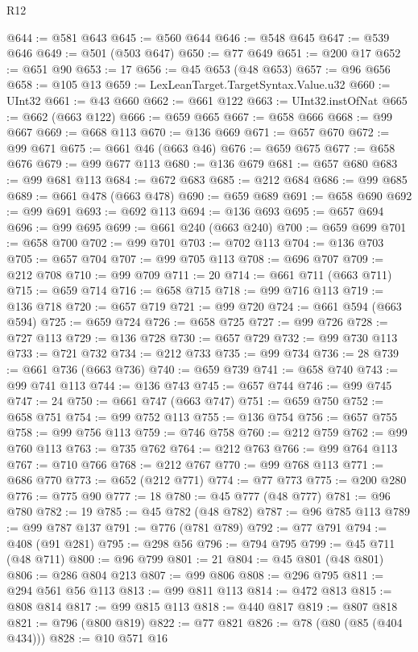 \begin{lexlean}{R12}
\begin{coremodule}
{{{{{{{{{{{{{{{{{{{{{{{{{{{{{{{{{{{{{{{{{{{{{{{{{{{{{{{{{{{{{{{{{{{{{{{{{{{{{{{{{{{{{{{{{{{{{{{{{{{{{{{{{{@644 := @581 @643
@645 := @560 @644
@646 := @548 @645
@647 := @539 @646
@649 := @501 (@503 @647)
@650 := @77 @649
@651 := @200 @17
@652 := @651 @90
@653 := 17
@656 := @45 @653 (@48 @653)
@657 := @96 @656
@658 := @105 @13
@659 := LexLeanTarget.TargetSyntax.Value.u32
@660 := UInt32
@661 := @43 @660
@662 := @661 @122
@663 := UInt32.instOfNat
@665 := @662 (@663 @122)
@666 := @659 @665
@667 := @658 @666
@668 := @99 @667
@669 := @668 @113
@670 := @136 @669
@671 := @657 @670
@672 := @99 @671
@675 := @661 @46 (@663 @46)
@676 := @659 @675
@677 := @658 @676
@679 := @99 @677 @113
@680 := @136 @679
@681 := @657 @680
@683 := @99 @681 @113
@684 := @672 @683
@685 := @212 @684
@686 := @99 @685
@689 := @661 @478 (@663 @478)
@690 := @659 @689
@691 := @658 @690
@692 := @99 @691
@693 := @692 @113
@694 := @136 @693
@695 := @657 @694
@696 := @99 @695
@699 := @661 @240 (@663 @240)
@700 := @659 @699
@701 := @658 @700
@702 := @99 @701
@703 := @702 @113
@704 := @136 @703
@705 := @657 @704
@707 := @99 @705 @113
@708 := @696 @707
@709 := @212 @708
@710 := @99 @709
@711 := 20
@714 := @661 @711 (@663 @711)
@715 := @659 @714
@716 := @658 @715
@718 := @99 @716 @113
@719 := @136 @718
@720 := @657 @719
@721 := @99 @720
@724 := @661 @594 (@663 @594)
@725 := @659 @724
@726 := @658 @725
@727 := @99 @726
@728 := @727 @113
@729 := @136 @728
@730 := @657 @729
@732 := @99 @730 @113
@733 := @721 @732
@734 := @212 @733
@735 := @99 @734
@736 := 28
@739 := @661 @736 (@663 @736)
@740 := @659 @739
@741 := @658 @740
@743 := @99 @741 @113
@744 := @136 @743
@745 := @657 @744
@746 := @99 @745
@747 := 24
@750 := @661 @747 (@663 @747)
@751 := @659 @750
@752 := @658 @751
@754 := @99 @752 @113
@755 := @136 @754
@756 := @657 @755
@758 := @99 @756 @113
@759 := @746 @758
@760 := @212 @759
@762 := @99 @760 @113
@763 := @735 @762
@764 := @212 @763
@766 := @99 @764 @113
@767 := @710 @766
@768 := @212 @767
@770 := @99 @768 @113
@771 := @686 @770
@773 := @652 (@212 @771)
@774 := @77 @773
@775 := @200 @280
@776 := @775 @90
@777 := 18
@780 := @45 @777 (@48 @777)
@781 := @96 @780
@782 := 19
@785 := @45 @782 (@48 @782)
@787 := @96 @785 @113
@789 := @99 @787 @137
@791 := @776 (@781 @789)
@792 := @77 @791
@794 := @408 (@91 @281)
@795 := @298 @56
@796 := @794 @795
@799 := @45 @711 (@48 @711)
@800 := @96 @799
@801 := 21
@804 := @45 @801 (@48 @801)
@806 := @286 @804 @213
@807 := @99 @806
@808 := @296 @795
@811 := @294 @561 @56 @113
@813 := @99 @811 @113
@814 := @472 @813
@815 := @808 @814
@817 := @99 @815 @113
@818 := @440 @817
@819 := @807 @818
@821 := @796 (@800 @819)
@822 := @77 @821
@826 := @78 (@80 (@85 (@404 @434)))
@828 := @10 @571 @16
}}}}}}}}}}}}}}}}}}}}}}}}}}}}}}}}}}}}}}}}}}}}}}}}}}}}}}}}}}}}}}}}}}}}}}}}}}}}}}}}}}}}}}}}}}}}}}}}}}}}}}}}}}
\end{coremodule}
\end{lexlean}

